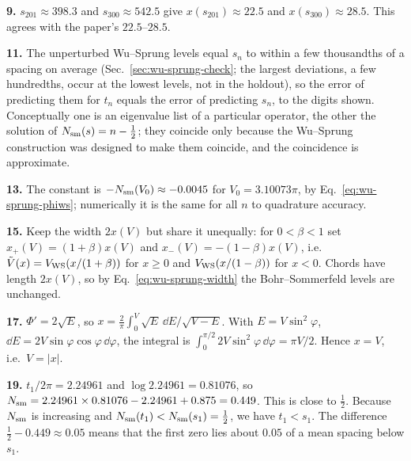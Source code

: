 \textbf{9.} $s_{201}\approx398.3$ and $s_{300}\approx542.5$ give $x(s_{201})\approx22.5$ and $x(s_{300})\approx28.5$. This agrees with the paper's $22.5$--$28.5$.

\textbf{11.} The unperturbed Wu--Sprung levels equal $s_n$ to within a few thousandths of a spacing on average (Sec.~\ref{sec:wu-sprung-check}; the largest deviations, a few hundredths, occur at the lowest levels, not in the holdout), so the error of predicting them for $t_n$ equals the error of predicting $s_n$, to the digits shown. Conceptually one is an eigenvalue list of a particular operator, the other the solution of $N_{\mathrm{sm}}(s)=n-\frac12$; they coincide only because the Wu--Sprung construction was designed to make them coincide, and the coincidence is approximate.

\textbf{13.} The constant is $-N_{\mathrm{sm}}(V_0)\approx-0.0045$ for $V_0=3.10073\pi$, by Eq.~\eqref{eq:wu-sprung-phiws}; numerically it is the same for all $n$ to quadrature accuracy.

\textbf{15.} Keep the width $2x(V)$ but share it unequally: for $0<\beta<1$ set $x_+(V)=(1+\beta)x(V)$ and $x_-(V)=-(1-\beta)x(V)$, i.e.\ $\tilde V(x)=V_{\rm WS}(x/(1+\beta))$ for $x\ge0$ and $V_{\rm WS}(x/(1-\beta))$ for $x<0$. Chords have length $2x(V)$, so by Eq.~\eqref{eq:wu-sprung-width} the Bohr--Sommerfeld levels are unchanged.

\textbf{17.} $\Phi'=2\sqrt E$, so $x=\frac2\pi\int_0^V\sqrt{E}\,\dd E/\sqrt{V-E}$. With $E=V\sin^2\varphi$, $\dd E=2V\sin\varphi\cos\varphi\,\dd\varphi$, the integral is $\int_0^{\pi/2}2V\sin^2\varphi\,\dd\varphi=\pi V/2$. Hence $x=V$, i.e.\ $V=|x|$.

\textbf{19.} $t_1/2\pi=2.24961$ and $\log2.24961=0.81076$, so $N_{\mathrm{sm}}=2.24961\times0.81076-2.24961+0.875=0.449$. This is close to $\frac12$. Because $N_{\mathrm{sm}}$ is increasing and $N_{\mathrm{sm}}(t_1)<N_{\mathrm{sm}}(s_1)=\frac12$, we have $t_1<s_1$. The difference $\frac12-0.449\approx0.05$ means that the first zero lies about $0.05$ of a mean spacing below $s_1$.
